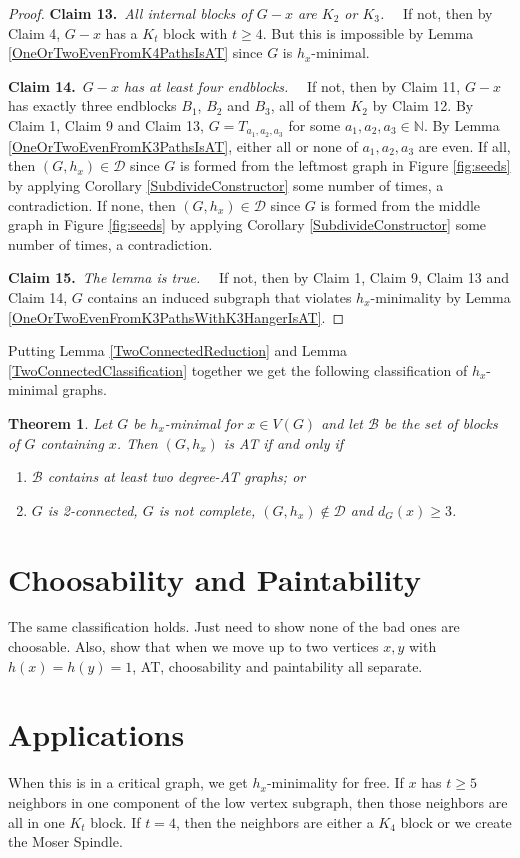 \documentclass[12pt]{article}
\theoremstyle{plain}
\newtheorem{thm}{Theorem}[section]
\theoremstyle{definition}
\theoremstyle{remark}
\newcommand{\fancy}[1]{\mathcal{#1}}
\newcommand{\IN}{\mathbb{N}}
\newcommand{\D}{\fancy{D}}
\def\D{\fancy{D}}
\def\B{\fancy{B}}
\newcommand{\claim}[2]{{\bf Claim #1.}~{\it #2}~~}
\begin{document}
\begin{proof}
	 \claim{13}{All internal blocks of $G-x$ are $K_2$ or $K_3$.}
	  If not, then by Claim 4, $G-x$ has a $K_t$ block with $t \ge 4$.  But this is impossible by Lemma \ref{OneOrTwoEvenFromK4PathsIsAT} since $G$ is $h_x$-minimal.
	 
	 \claim{14}{$G-x$ has at least four endblocks.}
	  If not, then by Claim 11, $G-x$ has exactly three endblocks $B_1$, $B_2$ and $B_3$, all of them $K_2$ by Claim 12.  By Claim 1, Claim 9 and Claim 13, $G = T_{a_1,a_2,a_3}$ for some $a_1,a_2,a_3 \in \IN$.  By Lemma \ref{OneOrTwoEvenFromK3PathsIsAT}, either all or none of $a_1,a_2,a_3$ are even.  If all, then $(G, h_x) \in \D$ since $G$ is formed from the leftmost graph in Figure \ref{fig:seeds} by applying Corollary \ref{SubdivideConstructor} some number of times, a contradiction.  If none, then $(G, h_x) \in \D$ since $G$ is formed from the middle graph in Figure \ref{fig:seeds} by applying Corollary \ref{SubdivideConstructor} some number of times, a contradiction.
	  
	 \claim{15}{The lemma is true.}
	 If not, then by Claim 1, Claim 9, Claim 13 and Claim 14, $G$ contains an induced subgraph that violates $h_x$-minimality by Lemma \ref{OneOrTwoEvenFromK3PathsWithK3HangerIsAT}.
\end{proof}

Putting Lemma \ref{TwoConnectedReduction} and Lemma \ref{TwoConnectedClassification} together we get the following classification of $h_x$-minimal graphs.

\begin{thm}
	Let $G$ be $h_x$-minimal for $x \in V(G)$ and let $\B$ be the set of blocks of $G$ containing $x$.  Then $(G,h_x)$ is AT if and only if
	\begin{enumerate}
		\item $\B$ contains at least two degree-AT graphs; or
		\item $G$ is 2-connected, $G$ is not complete, $(G,h_x) \not \in \D$ and $d_G(x) \ge 3$.
	\end{enumerate}
\end{thm}

\section{Choosability and Paintability}
The same classification holds.  Just need to show none of the bad ones are choosable.  Also, show that when we move up to two vertices $x,y$ with $h(x) = h(y) = 1$, AT, choosability and paintability all separate.

\section{Applications}
When this is in a critical graph, we get $h_x$-minimality for free.  If $x$ has $t \ge 5$ neighbors in one component of the low vertex subgraph, then those neighbors are all in one $K_t$ block.  If $t = 4$, then the neighbors are either a $K_4$ block or we create the Moser Spindle.



\end{document}
